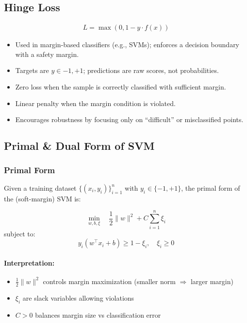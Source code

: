 \documentclass[10pt,a4paper]{article}
\begin{document}
		\subsection{Hinge Loss}
			\begin{align*}
				L = \max(0, 1 - y \cdot f(x))
			\end{align*}
		
			\begin{itemize}
				\item Used in margin-based classifiers (e.g., SVMs); enforces a decision boundary with a safety margin.
				\item Targets are $y \in {-1, +1}$; predictions are raw scores, not probabilities.
				\item Zero loss when the sample is correctly classified with sufficient margin.
				\item Linear penalty when the margin condition is violated.
				\item Encourages robustness by focusing only on “difficult” or misclassified points.
			\end{itemize}
	
	
		\subsection{Primal \& Dual Form of SVM}
	
		\subsubsection{Primal Form}
	
		Given a training dataset $\{(x_i, y_i)\}_{i=1}^n$ with $y_i \in \{-1, +1\}$, the primal form of the (soft-margin) SVM is:
	
		\[
		\min_{w, b, \xi} \quad \frac{1}{2} \|w\|^2 + C \sum_{i=1}^{n} \xi_i
		\]
		subject to:
		\[
		y_i (w^\top x_i + b) \geq 1 - \xi_i, \quad \xi_i \geq 0
		\]
	
		\paragraph{Interpretation:}
		\begin{itemize}
			\item $\frac{1}{2}\|w\|^2$ controls margin maximization (smaller norm $\Rightarrow$ larger margin)
			\item $\xi_i$ are slack variables allowing violations
			\item $C > 0$ balances margin size vs classification error
		\end{itemize}
	
\end{document}
